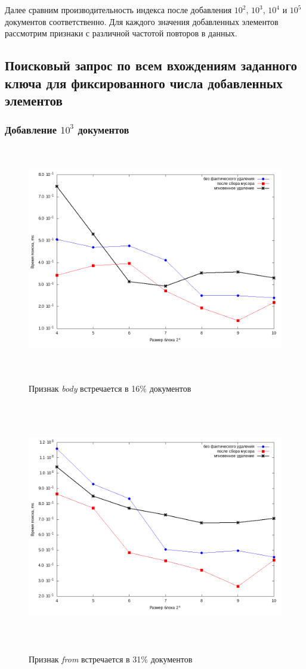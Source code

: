 Далее сравним производительность индекса после добавления $10^2$, $10^3$, $10^4$ и $10^5$
документов соответственно. Для каждого значения добавленных элементов рассмотрим
признаки с различной частотой повторов в данных.

\subsection{Поисковый запрос по всем вхождениям заданного ключа для фиксированного числа добавленных элементов}

\subsubsection{Добавление $10^3$ документов}

\begin{figure}[H]
\includegraphics[width=\linewidth, height=10cm]{fig/limit_1e6/1e3/body.png}
\caption{Признак \textit{body} встречается в 16\% документов}
\includegraphics[width=\linewidth, height=11cm]{fig/limit_1e6/1e3/from.png}
\caption{Признак \textit{from} встречается в 31\% документов}
\end{figure}

